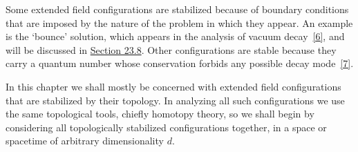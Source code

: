 Some extended field configurations are stabilized because of boundary
conditions that are imposed by the nature of the problem in which they
appear. An example is the `bounce' solution, which appears in the analysis
of vacuum decay~\hyperref[ch23-ref-6]{[6]}, and will be discussed in
\hyperref[sec:23.8]{Section 23.8}. Other configurations are stable because
they carry a quantum number whose conservation forbids any possible decay
mode~\hyperref[ch23-ref-7]{[7]}.

In this chapter we shall mostly be concerned with extended field
configurations that are stabilized by their topology. In analyzing all such
configurations we use the same topological tools, chiefly homotopy theory,
so we shall begin by considering all topologically stabilized
configurations together, in a space or spacetime of arbitrary dimensionality
$d$.
